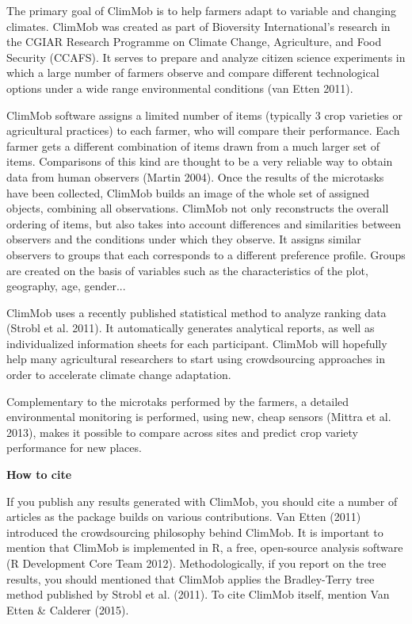 \documentclass[10pt]{article}
\begin{document}
\begin{titlepage}
The primary goal of ClimMob is to help farmers adapt to variable and changing climates. ClimMob was created as part of Bioversity International's research in the CGIAR Research Programme on Climate Change, Agriculture, and Food Security (CCAFS). It serves to prepare and analyze citizen science experiments in which a large number of farmers observe and compare different technological options under a wide range environmental conditions (van Etten 2011).\par
ClimMob software assigns a limited number of items (typically 3 crop varieties or agricultural practices) to each farmer, who will compare their performance. Each farmer gets a different combination of items drawn from a much larger set of items. Comparisons of this kind are thought to be a very reliable way to obtain data from human observers (Martin 2004). Once the results of the microtasks have been collected, ClimMob builds an image of the whole set of assigned objects, combining all observations. ClimMob not only reconstructs the overall ordering of items, but also takes into account differences and similarities between observers and the conditions under which they observe. It assigns similar observers to groups that each corresponds to a different preference profile. Groups are created on the basis of variables such as the characteristics of the plot, geography, age, gender...\par
ClimMob uses a recently published statistical method to analyze ranking data (Strobl et al. 2011). It automatically generates analytical reports, as well as individualized information sheets for each participant. ClimMob will hopefully help many agricultural researchers to start using crowdsourcing approaches in order to accelerate climate change adaptation.\par
Complementary to the microtaks performed by the farmers, a detailed environmental monitoring is performed, using new, cheap sensors (Mittra et al. 2013), makes it possible to compare across sites and predict crop variety performance for new places.

\vfill
\noindent\makebox[\linewidth]{\rule{\textwidth}{0.4pt}}

\textbf{How to cite}

	If you publish any results generated with ClimMob, you should cite a number of articles as the package builds on various contributions. Van Etten (2011) introduced the crowdsourcing philosophy behind ClimMob. It is important to mention that ClimMob is implemented in R, a free, open-source analysis software (R Development Core Team 2012). Methodologically, if you report on the tree results, you should mentioned that ClimMob applies the Bradley-Terry tree method published by Strobl et al. (2011). To cite ClimMob itself, mention Van Etten \& Calderer (2015).


\end{titlepage}
\end{document}
